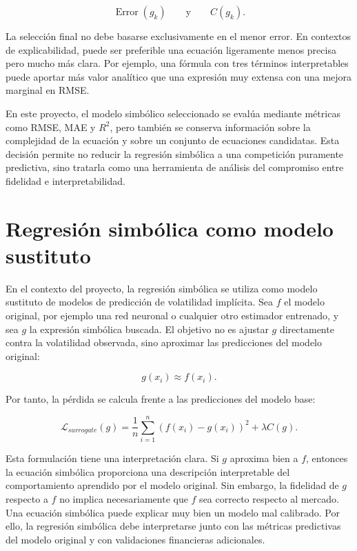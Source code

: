 \begin{equation}
\operatorname{Error}(g_k)
\qquad
\text{y}
\qquad
C(g_k).
\label{eq:symbolic-error-complexity}
\end{equation}

La selección final no debe basarse exclusivamente en el menor error. En contextos de explicabilidad, puede ser preferible una ecuación ligeramente menos precisa pero mucho más clara. Por ejemplo, una fórmula con tres términos interpretables puede aportar más valor analítico que una expresión muy extensa con una mejora marginal en RMSE.

En este proyecto, el modelo simbólico seleccionado se evalúa mediante métricas como RMSE, MAE y \(R^2\), pero también se conserva información sobre la complejidad de la ecuación y sobre un conjunto de ecuaciones candidatas. Esta decisión permite no reducir la regresión simbólica a una competición puramente predictiva, sino tratarla como una herramienta de análisis del compromiso entre fidelidad e interpretabilidad.

\section{Regresión simbólica como modelo sustituto}

En el contexto del proyecto, la regresión simbólica se utiliza como modelo sustituto de modelos de predicción de volatilidad implícita. Sea \(f\) el modelo original, por ejemplo una red neuronal o cualquier otro estimador entrenado, y sea \(g\) la expresión simbólica buscada. El objetivo no es ajustar \(g\) directamente contra la volatilidad observada, sino aproximar las predicciones del modelo original:

\begin{equation}
g(x_i) \approx f(x_i).
\label{eq:symbolic-surrogate}
\end{equation}

Por tanto, la pérdida se calcula frente a las predicciones del modelo base:

\begin{equation}
\mathcal{L}_{surrogate}(g)
=
\frac{1}{n}
\sum_{i=1}^{n}
\left(
f(x_i) - g(x_i)
\right)^2
+
\lambda C(g).
\label{eq:symbolic-surrogate-loss}
\end{equation}

Esta formulación tiene una interpretación clara. Si \(g\) aproxima bien a \(f\), entonces la ecuación simbólica proporciona una descripción interpretable del comportamiento aprendido por el modelo original. Sin embargo, la fidelidad de \(g\) respecto a \(f\) no implica necesariamente que \(f\) sea correcto respecto al mercado. Una ecuación simbólica puede explicar muy bien un modelo mal calibrado. Por ello, la regresión simbólica debe interpretarse junto con las métricas predictivas del modelo original y con validaciones financieras adicionales.

